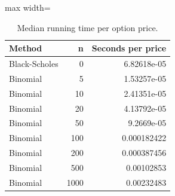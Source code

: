 \begin{table}
\centering
\small
\caption{Median running time per option price.}
\label{tab:e7_timing}
\begin{adjustbox}{max width=\textwidth}
\begin{tabular}{lrr}
\toprule
Method & n & Seconds per price \\
\midrule
Black-Scholes & 0 & 6.82618e-05 \\
Binomial & 5 & 1.53257e-05 \\
Binomial & 10 & 2.41351e-05 \\
Binomial & 20 & 4.13792e-05 \\
Binomial & 50 & 9.2669e-05 \\
Binomial & 100 & 0.000182422 \\
Binomial & 200 & 0.000387456 \\
Binomial & 500 & 0.00102853 \\
Binomial & 1000 & 0.00232483 \\
\bottomrule
\end{tabular}
\end{adjustbox}
\end{table}

